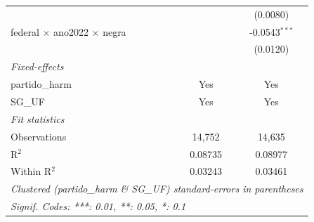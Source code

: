 \begin{tabular}{lcc}
                                              &                 & (0.0080)\\   
   federal $\times$ ano2022 $\times$ negra    &                 & -0.0543$^{***}$\\   
                                              &                 & (0.0120)\\   
   \midrule
   \emph{Fixed-effects}\\
   partido\_harm                              & Yes             & Yes\\  
   SG\_UF                                     & Yes             & Yes\\  
   \midrule
   \emph{Fit statistics}\\
   Observations                               & 14,752          & 14,635\\  
   R$^2$                                      & 0.08735         & 0.08977\\  
   Within R$^2$                               & 0.03243         & 0.03461\\  
   \midrule \midrule
   \multicolumn{3}{l}{\emph{Clustered (partido\_harm \& SG\_UF) standard-errors in parentheses}}\\
   \multicolumn{3}{l}{\emph{Signif. Codes: ***: 0.01, **: 0.05, *: 0.1}}\\
\end{tabular}
\par\endgroup


